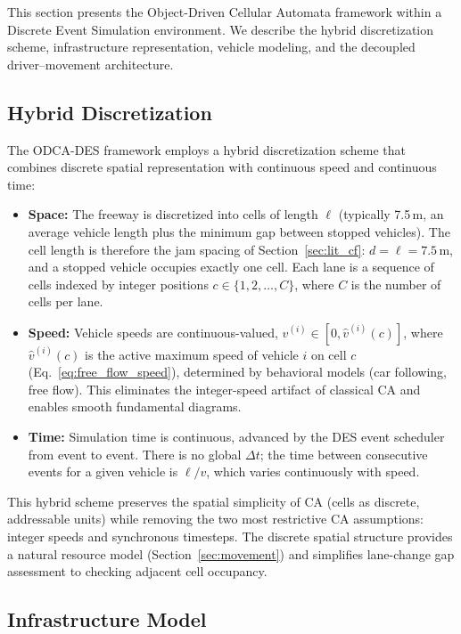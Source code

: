 \documentclass[review,number]{elsarticle}
\begin{document}
This section presents the Object-Driven Cellular Automata framework within a Discrete Event Simulation environment. We describe the hybrid discretization scheme, infrastructure representation, vehicle modeling, and the decoupled driver--movement architecture.

\subsection{Hybrid Discretization}
\label{sec:discretization}

The ODCA-DES framework employs a hybrid discretization scheme that combines discrete spatial representation with continuous speed and continuous time:

\begin{itemize}
    \item \textbf{Space:} The freeway is discretized into cells of length $\ell$ (typically 7.5\,m, an average vehicle length plus the minimum gap between stopped vehicles). The cell length is therefore the jam spacing of Section~\ref{sec:lit_cf}: $d = \ell = 7.5$\,m, and a stopped vehicle occupies exactly one cell. Each lane is a sequence of cells indexed by integer positions $c \in \{1, 2, \ldots, C\}$, where $C$ is the number of cells per lane.

    \item \textbf{Speed:} Vehicle speeds are continuous-valued, $v^{(i)} \in [0, \hat{v}^{(i)}(c)]$, where $\hat{v}^{(i)}(c)$ is the active maximum speed of vehicle $i$ on cell $c$ (Eq.~\ref{eq:free_flow_speed}), determined by behavioral models (car following, free flow). This eliminates the integer-speed artifact of classical CA and enables smooth fundamental diagrams.

    \item \textbf{Time:} Simulation time is continuous, advanced by the DES event scheduler from event to event. There is no global $\Delta t$; the time between consecutive events for a given vehicle is $\ell / v$, which varies continuously with speed.
\end{itemize}

This hybrid scheme preserves the spatial simplicity of CA (cells as discrete, addressable units) while removing the two most restrictive CA assumptions: integer speeds and synchronous timesteps. The discrete spatial structure provides a natural resource model (Section~\ref{sec:movement}) and simplifies lane-change gap assessment to checking adjacent cell occupancy.

\subsection{Infrastructure Model}
\label{sec:infrastructure}
\end{document}
